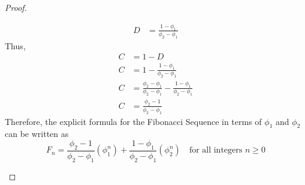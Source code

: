 \begin{proof}
\begin{enumerate}
\begin{align*}
            D &= \frac{1 - \phi_1}{\phi_2 - \phi_1}
        \end{align*}
        Thus,
        \begin{align*}
            C &= 1 - D \\
            C &= 1 - \frac{1 - \phi_1}{\phi_2 - \phi_1} \\
            C &= \frac{\phi_2 - \phi_1}{\phi_2 - \phi_1} - \frac{1 - \phi_1}{\phi_2 - \phi_1} \\
            C &= \frac{\phi_2 - 1}{\phi_2 - \phi_1}
        \end{align*}
        Therefore, the explicit formula for the Fibonacci Sequence in terms of $\phi_1$ and $\phi_2$ can be written as
        \begin{equation*}
            F_n = \dfrac{\phi_2 - 1}{\phi_2 - \phi_1}(\phi_1^n) + \dfrac{1 - \phi_1}{\phi_2 - \phi_1}(\phi_2^n) \quad \text{for all integers $n \geq 0$}
        \end{equation*}
    \end{enumerate}
\end{proof}